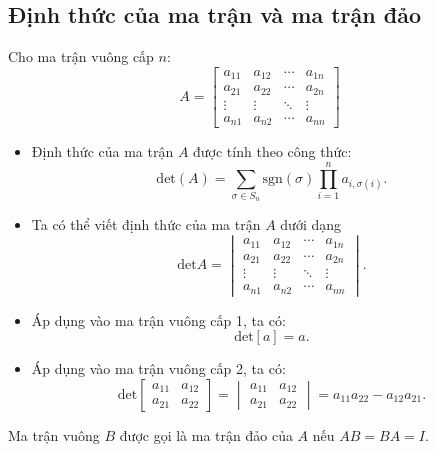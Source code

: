 \documentclass[12pt,a4paper]{report}
\begin{document}
\subsection{ Định thức của ma trận và ma trận đảo}
Cho ma trận vuông cấp $n$:
\begin{equation*}
A =
\begin{bmatrix}
	a_{11} & a_{12} & \cdots & a_{1n} \\
	a_{21} & a_{22} & \cdots & a_{2n} \\
	\vdots & \vdots & \ddots & \vdots \\
	a_{n1} & a_{n2} & \cdots & a_{nn} 
\end{bmatrix}
\end{equation*}
\begin{itemize}
\item Định thức của ma trận $A$ được tính theo công thức:
\begin{equation}
\text{det}(A) = \sum _{\sigma \in S_n} \text{sgn} (\sigma) \prod _{i=1}^n a_{i,\sigma (i)}.
\end{equation}
\item Ta có thể viết định thức của ma trận $A$ dưới dạng
\begin{equation*}
\text{det} A =
\begin{vmatrix}
	a_{11} & a_{12} & \cdots & a_{1n} \\
	a_{21} & a_{22} & \cdots & a_{2n} \\
	\vdots & \vdots & \ddots & \vdots \\
	a_{n1} & a_{n2} & \cdots & a_{nn} 
\end{vmatrix}.
\end{equation*}
\item Áp dụng vào ma trận vuông cấp 1, ta có:
\begin{equation}
\text{det}[a]=a.
\end{equation}
\item Áp dụng vào ma trận vuông cấp 2, ta có:
\begin{equation}
\text{det} \begin{bmatrix}
a_{11} & a_{12} \\
a_{21} & a_{22}
\end{bmatrix} = \begin{vmatrix}
a_{11} & a_{12} \\
a_{21} & a_{22}
\end{vmatrix} = a_{11}a_{22} - a_{12}a_{21}.
\end{equation}
\end{itemize}
Ma trận vuông $B$ được gọi là ma trận đảo của $A$ nếu $AB=BA=I$.
\end{document}
